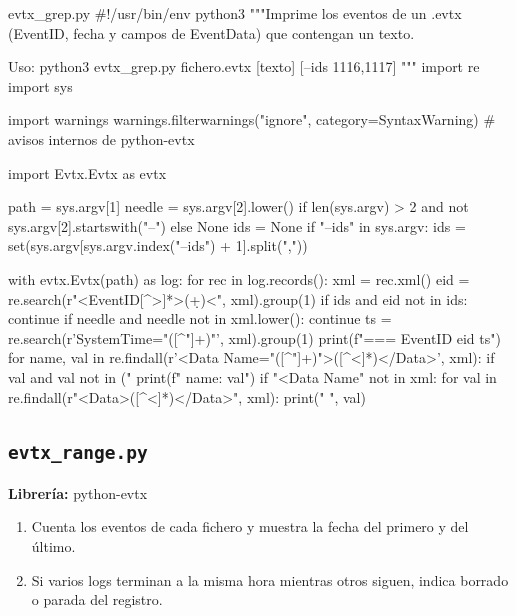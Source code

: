 \documentclass[11pt,a4paper]{article}
\begin{document}
\begin{codigopython}{evtx\_grep.py}
#!/usr/bin/env python3
"""Imprime los eventos de un .evtx (EventID, fecha y campos de EventData) que contengan un texto.

Uso: python3 evtx_grep.py fichero.evtx [texto] [--ids 1116,1117]
"""
import re
import sys

import warnings
warnings.filterwarnings("ignore", category=SyntaxWarning)  # avisos internos de python-evtx

import Evtx.Evtx as evtx

path = sys.argv[1]
needle = sys.argv[2].lower() if len(sys.argv) > 2 and not sys.argv[2].startswith("--") else None
ids = None
if "--ids" in sys.argv:
    ids = set(sys.argv[sys.argv.index("--ids") + 1].split(","))

with evtx.Evtx(path) as log:
    for rec in log.records():
        xml = rec.xml()
        eid = re.search(r"<EventID[^>]*>(\d+)<", xml).group(1)
        if ids and eid not in ids:
            continue
        if needle and needle not in xml.lower():
            continue
        ts = re.search(r'SystemTime="([^"]+)"', xml).group(1)
        print(f"=== EventID {eid}  {ts}")
        for name, val in re.findall(r'<Data Name="([^"]+)">([^<]*)</Data>', xml):
            if val and val not in ("%
                print(f"   {name}: {val}")
        if "<Data Name" not in xml:
            for val in re.findall(r"<Data>([^<]*)</Data>", xml):
                print("   ", val)
\end{codigopython}

\subsection{\texttt{evtx\_range.py}}
\textbf{Librería:} python-evtx
\begin{enumerate}

\item Cuenta los eventos de cada fichero y muestra la fecha del primero y del último.

\item Si varios logs terminan a la misma hora mientras otros siguen, indica borrado o parada del registro.

\end{enumerate}
\end{document}
